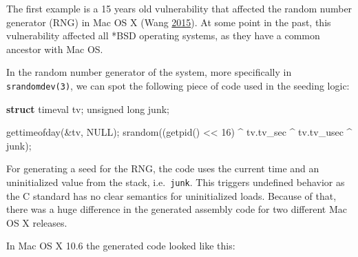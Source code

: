 \documentclass[a4paper,]{report}
\newenvironment{Shaded}{}{}
\newcommand{\BaseNTok}[1]{\textcolor[rgb]{0.25,0.63,0.44}{#1}}
\newcommand{\BuiltInTok}[1]{#1}
\newcommand{\CommentTok}[1]{\textcolor[rgb]{0.38,0.63,0.69}{\textit{#1}}}
\newcommand{\DataTypeTok}[1]{\textcolor[rgb]{0.56,0.13,0.00}{#1}}
\newcommand{\DecValTok}[1]{\textcolor[rgb]{0.25,0.63,0.44}{#1}}
\newcommand{\KeywordTok}[1]{\textcolor[rgb]{0.00,0.44,0.13}{\textbf{#1}}}
\newcommand{\NormalTok}[1]{#1}
\begin{document}
The first example is a 15 years old vulnerability that affected the
random number generator (RNG) in Mac OS X (Wang
\protect\hyperlink{ref-Wang2015}{2015}). At some point in the past, this
vulnerability affected all *BSD operating systems, as they have a common
ancestor with Mac OS.

In the random number generator of the system, more specifically in
\texttt{srandomdev(3)}, we can spot the following piece of code used in
the seeding logic:

\begin{Shaded}
\begin{Highlighting}[]
\KeywordTok{struct}\NormalTok{ timeval tv;}
\DataTypeTok{unsigned} \DataTypeTok{long}\NormalTok{ junk;}

\NormalTok{gettimeofday(&tv, NULL);}
\NormalTok{srandom((getpid() << }\DecValTok{16}\NormalTok{) ^ tv.tv_sec ^ tv.tv_usec ^ junk);}
\end{Highlighting}
\end{Shaded}

For generating a seed for the RNG, the code uses the current time and an
uninitialized value from the stack, i.e.~\texttt{junk}. This triggers
undefined behavior as the C standard has no clear semantics for
uninitialized loads. Because of that, there was a huge difference in the
generated assembly code for two different Mac OS X releases.

In Mac OS X 10.6 the generated code looked like this:

\begin{Shaded}
\end{Shaded}
\end{document}
